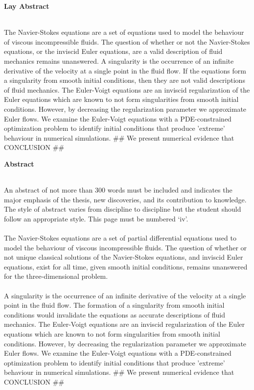 \documentclass[12pt]{article}
\numberwithin{equation}{section}
\begin{document}
\pagebreak

\begin{flushleft}
\begin{large}
\textbf{Lay Abstract}
\\~\\
\end{large}
\end{flushleft}


The Navier-Stokes equations are a set of equations used to model the behaviour of viscous incompressible fluids. The question of whether or not the Navier-Stokes equations, or the inviscid Euler equations, are a valid description of fluid mechanics remains unanswered. A singularity is the occurrence of an infinite derivative of the velocity at a single point in the fluid flow. If the equations form a singularity from smooth initial conditions, then they are not valid descriptions of fluid mechanics. The Euler-Voigt equations are an inviscid regularization of the Euler equations which are known to not form singularities from smooth initial conditions. However, by decreasing the regularization parameter we approximate Euler flows. We examine the Euler-Voigt equations with a PDE-constrained optimization problem to identify initial conditions that produce 'extreme' behaviour in numerical simulations.  \#\# We present numerical evidence that CONCLUSION \#\#

\pagebreak

\begin{large}
\textbf{Abstract}
\\~\\
\end{large}

An abstract of not more than 300 words must be included and indicates the major emphasis of the thesis, new discoveries, and its contribution to knowledge. The style of abstract varies from discipline to discipline but the student should follow an appropriate style. This page must be numbered ‘iv’.
\\~\\
The Navier-Stokes equations are a set of partial differential equations used to model the behaviour of viscous incompressible fluids. The question of whether or not unique classical solutions of the Navier-Stokes equations, and inviscid Euler equations, exist for all time, given smooth initial conditions, remains unanswered for the three-dimensional problem. 
\\~\\
A singularity is the occurrence of an infinite derivative of the velocity at a single point in the fluid flow. The formation of a singularity from smooth initial conditions would invalidate the equations as accurate descriptions of fluid mechanics. The Euler-Voigt equations are an inviscid regularization of the Euler equations which are known to not form singularities from smooth initial conditions. However, by decreasing the regularization parameter we approximate Euler flows. We examine the Euler-Voigt equations with a PDE-constrained optimization problem to identify initial conditions that produce 'extreme' behaviour in numerical simulations.  \#\# We present numerical evidence that CONCLUSION \#\#
\end{document}
